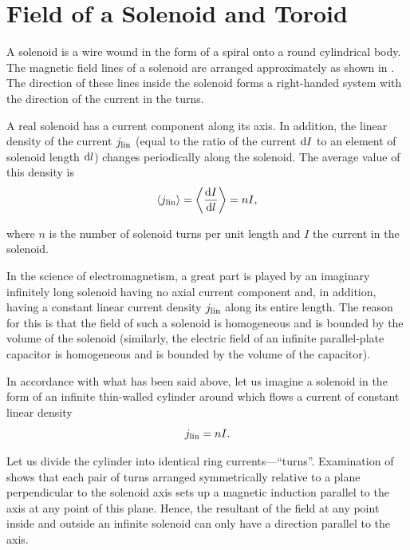 \section{Field of a Solenoid and Toroid}\label{sec:6_12}

A solenoid is a wire wound in the form of a spiral onto a round cylindrical body. The magnetic field lines of a solenoid are arranged approximately as shown in . The direction of these lines inside the solenoid forms a right-handed system with the direction of the current in the turns.

A real solenoid has a current component along its axis. In addition, the linear density of the current $j_{\text{lin}}$ (equal to the ratio of the current $\mathrm{d} I$ to an element of solenoid length $\mathrm{d} l$) changes periodically along the solenoid. The average value of this density is
\begin{equation}\label{eq:6_105}
    \left\langle j_{\text{lin}} \right\rangle = \left\langle \dfrac{\mathrm{d} I}{\mathrm{d} l} \right\rangle = nI,
\end{equation}

\noindent
where $n$ is the number of solenoid turns per unit length and $I$ the current in the solenoid.

In the science of electromagnetism, a great part is played by an imaginary infinitely long solenoid having no axial current component and, in addition, having a constant linear current density $j_{\text{lin}}$ along its entire length. The reason for this is that the field of such a solenoid is homogeneous and is bounded by the volume of the solenoid (similarly, the electric field of an infinite parallel-plate capacitor is homogeneous and is bounded by the volume of the capacitor).

In accordance with what has been said above, let us imagine a solenoid in the form of an infinite thin-walled cylinder around which flows a current of constant linear density
\begin{equation}\label{eq:6_106}
    j_{\text{lin}} = nI.
\end{equation}

\noindent
Let us divide the cylinder into identical ring currents---``turns''. Examination of  shows that each pair of turns arranged symmetrically relative to a plane perpendicular to the solenoid axis sets up a magnetic induction parallel to the axis at any point of this plane. Hence, the resultant of the field at any point inside and outside an infinite solenoid can only have a direction parallel to the axis.


